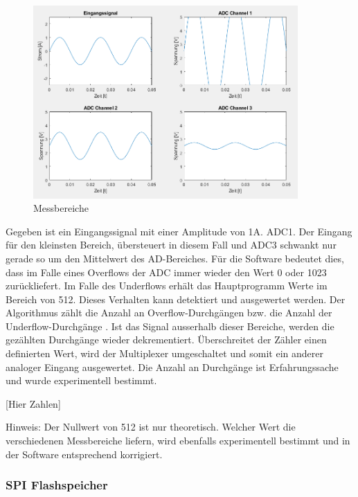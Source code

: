 \begin{figure}[H]
\begin{center}
\includegraphics[width=0.9\textwidth]{images/Software_messbereich.png}
\caption{Messbereiche}
\label{fig:Software_messbereich}
\end{center}
\end{figure}

Gegeben ist ein Eingangssignal mit einer Amplitude von 1A. ADC1. Der Eingang für den kleinsten Bereich, übersteuert in diesem Fall und ADC3 schwankt nur gerade so um den Mittelwert des AD-Bereiches. Für die Software bedeutet dies, dass im Falle eines Overflows der ADC immer wieder den Wert 0 oder 1023 zurückliefert. Im Falle des Underflows erhält das Hauptprogramm Werte im Bereich von 512. Dieses Verhalten kann detektiert und ausgewertet werden. Der Algorithmus zählt die Anzahl an \glqq Overflow-Durchgängen \grqq{} bzw. die Anzahl der  \glqq Underflow-Durchgänge\grqq{} . Ist das Signal ausserhalb dieser Bereiche, werden die gezählten Durchgänge wieder dekrementiert. Überschreitet der Zähler einen definierten Wert, wird der Multiplexer umgeschaltet und somit ein anderer analoger Eingang ausgewertet. Die Anzahl an Durchgänge ist Erfahrungssache und wurde experimentell bestimmt. 

[Hier Zahlen]

Hinweis: Der Nullwert von 512 ist nur theoretisch. Welcher Wert die verschiedenen Messbereiche liefern, wird ebenfalls experimentell bestimmt und in der Software entsprechend korrigiert.

\subsubsection*{SPI Flashspeicher}

